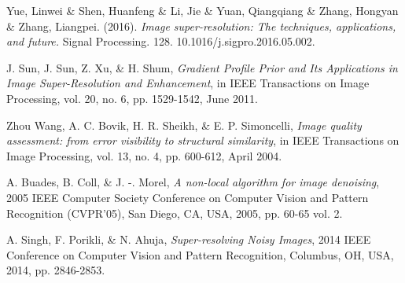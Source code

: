 \documentclass[a4paper,11pt]{article}
\begin{document}
\begin{thebibliography}{10}

 {\sc Yue, Linwei \& Shen, Huanfeng \& Li, Jie \& Yuan, Qiangqiang \& Zhang, Hongyan \& Zhang, Liangpei.} (2016). {\em Image super-resolution: The techniques, applications, and future.} Signal Processing. 128. 10.1016/j.sigpro.2016.05.002. 

 {\sc J. Sun, J. Sun, Z. Xu, \& H. Shum}, {\em Gradient Profile Prior and Its Applications in Image Super-Resolution and Enhancement}, in IEEE Transactions on Image Processing, vol. 20, no. 6, pp. 1529-1542, June 2011.

 {\sc Zhou Wang, A. C. Bovik, H. R. Sheikh, \& E. P. Simoncelli}, {\em Image quality assessment: from error visibility to structural similarity}, in IEEE Transactions on Image Processing, vol. 13, no. 4, pp. 600-612, April 2004.

 {\sc A. Buades, B. Coll, \& J. -. Morel}, {\em A non-local algorithm for image denoising}, 2005 IEEE Computer Society Conference on Computer Vision and Pattern Recognition (CVPR'05), San Diego, CA, USA, 2005, pp. 60-65 vol. 2.

 {\sc A. Singh, F. Porikli, \& N. Ahuja}, {\em Super-resolving Noisy Images}, 2014 IEEE Conference on Computer Vision and Pattern Recognition, Columbus, OH, USA, 2014, pp. 2846-2853.

\end{thebibliography}
\end{document}

